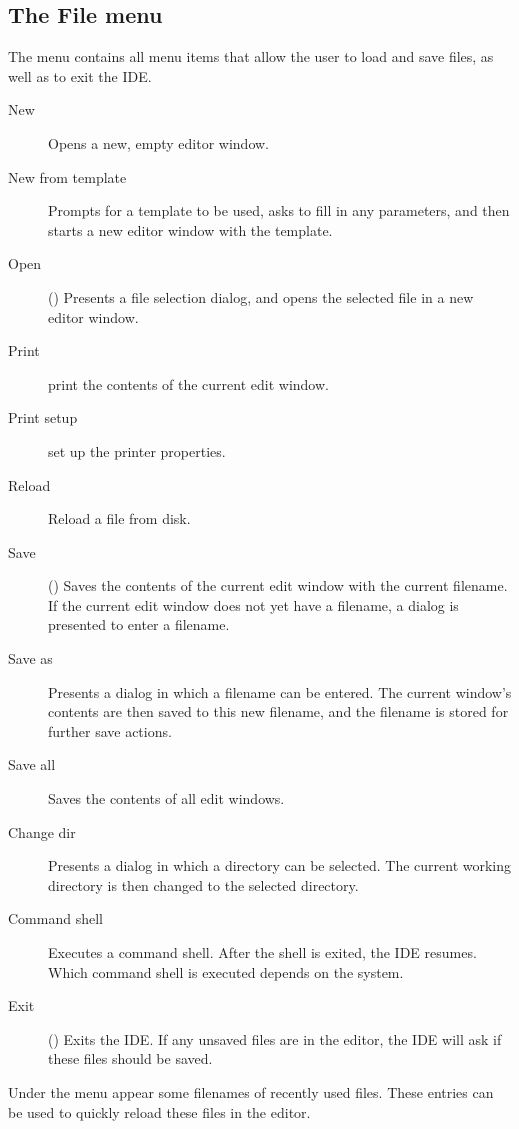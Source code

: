 \subsection{The File menu}
\label{se:menufile}
The  menu contains all menu items that allow the user 
to load and save files, as well as to exit the IDE.
\begin{description}
\item[New] Opens a new, empty editor window.
\item[New from template] Prompts for a template to be used, asks to fill in
any parameters, and then starts a new editor window with the template.
\item[Open] () Presents a file selection dialog, and opens
the selected file in a new editor window.
\item[Print] print the contents of the current edit window.
\item[Print setup] set up the printer properties.
\item[Reload] Reload a file from disk.
\item[Save] () Saves the contents of the current edit window
with the current filename. If the current edit window does not yet have
a filename, a dialog is presented to enter a filename.
\item[Save as] Presents a dialog in which a filename can be entered. The
current window's contents are then saved to this new filename, and the
filename is stored for further save actions.
\item[Save all] Saves the contents of all edit windows.

\item[Change dir] Presents a dialog in which a directory can be selected.
The current working directory is then changed to the selected directory.
\item[Command shell] Executes a command shell. After the shell is exited, the
IDE resumes. Which command shell is executed depends on the system.
\item[Exit] () Exits the IDE. If any unsaved files are
in the editor, the IDE will ask if these files should be saved.
\end{description}
Under the  menu appear some filenames of recently used files.
These entries can be used to quickly reload these files in the editor.

%
%
